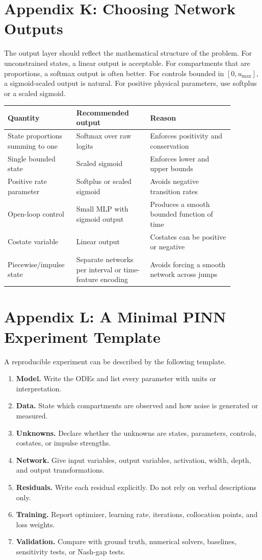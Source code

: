 \documentclass[11pt,a4paper]{article}
\begin{document}
\section{Appendix K: Choosing Network Outputs}
The output layer should reflect the mathematical structure of the problem. For unconstrained states, a linear output is acceptable. For compartments that are proportions, a softmax output is often better. For controls bounded in $[0,u_{\max}]$, a sigmoid-scaled output is natural. For positive physical parameters, use softplus or a scaled sigmoid.

\begin{longtable}{p{0.24\linewidth}p{0.30\linewidth}p{0.34\linewidth}}
\toprule
Quantity & Recommended output & Reason \\
\midrule
State proportions summing to one & Softmax over raw logits & Enforces positivity and conservation \\
Single bounded state & Scaled sigmoid & Enforces lower and upper bounds \\
Positive rate parameter & Softplus or scaled sigmoid & Avoids negative transition rates \\
Open-loop control & Small MLP with sigmoid output & Produces a smooth bounded function of time \\
Costate variable & Linear output & Costates can be positive or negative \\
Piecewise/impulse state & Separate networks per interval or time-feature encoding & Avoids forcing a smooth network across jumps \\
\bottomrule
\end{longtable}

\section{Appendix L: A Minimal PINN Experiment Template}
A reproducible experiment can be described by the following template.
\begin{enumerate}[leftmargin=2em]
    \item \textbf{Model.} Write the ODEs and list every parameter with units or interpretation.
    \item \textbf{Data.} State which compartments are observed and how noise is generated or measured.
    \item \textbf{Unknowns.} Declare whether the unknowns are states, parameters, controls, costates, or impulse strengths.
    \item \textbf{Network.} Give input variables, output variables, activation, width, depth, and output transformations.
    \item \textbf{Residuals.} Write each residual explicitly. Do not rely on verbal descriptions only.
    \item \textbf{Training.} Report optimizer, learning rate, iterations, collocation points, and loss weights.
    \item \textbf{Validation.} Compare with ground truth, numerical solvers, baselines, sensitivity tests, or Nash-gap tests.
\end{enumerate}
\end{document}
